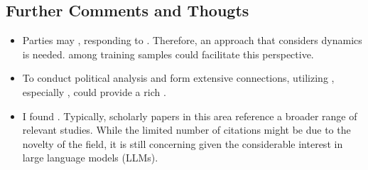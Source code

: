 \subsection{Further Comments and Thougts}
\begin{itemize}
    \item Parties may , responding to . Therefore, an approach that considers  dynamics is needed.  among training samples  could facilitate this perspective.  
    \item To conduct political analysis and form extensive connections, utilizing , especially , could provide a rich . 
    \item I found . Typically, scholarly papers in this area reference a broader range of relevant studies. While the limited number of citations might be due to the novelty of the field, it is still concerning given the considerable interest in large language models (LLMs). 
\end{itemize}

\newpage